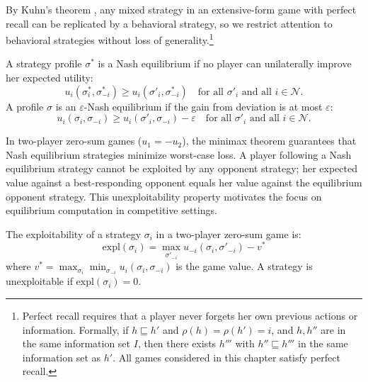 By Kuhn's theorem \citep{kuhn1953extensive}, any mixed strategy in an extensive-form game with perfect recall can be replicated by a behavioral strategy, so we restrict attention to behavioral strategies without loss of generality.\footnote{Perfect recall requires that a player never forgets her own previous actions or information. Formally, if $h \sqsubseteq h'$ and $\rho(h) = \rho(h') = i$, and $h, h''$ are in the same information set $I$, then there exists $h'''$ with $h'' \sqsubseteq h'''$ in the same information set as $h'$. All games considered in this chapter satisfy perfect recall.}

\begin{definition}
A strategy profile $\sigma^*$ is a Nash equilibrium if no player can unilaterally improve her expected utility:
\begin{equation}
u_i(\sigma^*_i, \sigma^*_{-i}) \geq u_i(\sigma'_i, \sigma^*_{-i}) \quad \text{for all } \sigma'_i \text{ and all } i \in \mathcal{N}.
\end{equation}
A profile $\sigma$ is an $\varepsilon$-Nash equilibrium if the gain from deviation is at most $\varepsilon$:
\begin{equation}
u_i(\sigma_i, \sigma_{-i}) \geq u_i(\sigma'_i, \sigma_{-i}) - \varepsilon \quad \text{for all } \sigma'_i \text{ and all } i \in \mathcal{N}.
\end{equation}
\end{definition}

In two-player zero-sum games ($u_1 = -u_2$), the minimax theorem guarantees that Nash equilibrium strategies minimize worst-case loss. A player following a Nash equilibrium strategy cannot be exploited by any opponent strategy; her expected value against a best-responding opponent equals her value against the equilibrium opponent strategy. This unexploitability property motivates the focus on equilibrium computation in competitive settings.

\begin{definition}[Exploitability]
The exploitability of a strategy $\sigma_i$ in a two-player zero-sum game is:
\begin{equation}
\text{expl}(\sigma_i) = \max_{\sigma'_{-i}} u_{-i}(\sigma_i, \sigma'_{-i}) - v^*
\end{equation}
where $v^* = \max_{\sigma_i} \min_{\sigma_{-i}} u_i(\sigma_i, \sigma_{-i})$ is the game value. A strategy is unexploitable if $\text{expl}(\sigma_i) = 0$.
\end{definition}

